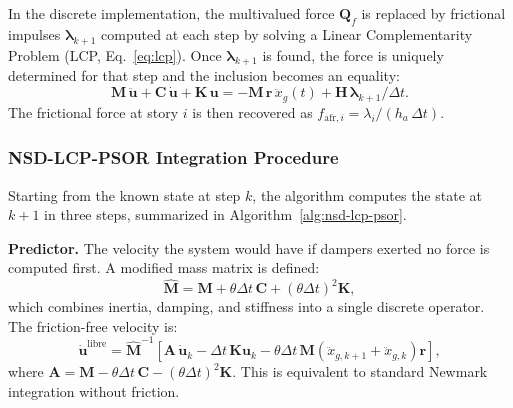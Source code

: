 \documentclass[preprint,12pt,authoryear]{elsarticle}
\newcommand{\ha}{h_a}
\begin{document}
In the discrete implementation, the multivalued force $\bm{Q}_f$ is replaced by
frictional impulses $\bm{\lambda}_{k+1}$ computed at each step by solving a Linear
Complementarity Problem (LCP, Eq.~\ref{eq:lcp}). Once $\bm{\lambda}_{k+1}$ is found,
the force is uniquely determined for that step and the inclusion becomes an equality:
\begin{equation}
    \bm{M}\,\ddot{\bm{u}} + \bm{C}\,\dot{\bm{u}} + \bm{K}\,\bm{u}
    = -\bm{M}\,\bm{r}\,\ddot{x}_g(t) + \bm{H}\,\bm{\lambda}_{k+1}/\Delta t.
    \label{eq:eom_disc}
\end{equation}
The frictional force at story $i$ is then recovered as
$f_{\mathrm{afr},i} = \lambda_i / (\ha\,\Delta t)$.

\subsubsection*{NSD-LCP-PSOR Integration Procedure}

Starting from the known state at step $k$, the algorithm computes the state at $k+1$
in three steps, summarized in Algorithm~\ref{alg:nsd-lcp-psor}.

\textbf{Predictor.}
The velocity the system would have if dampers exerted no force is computed first.
A modified mass matrix is defined:
\begin{equation}
    \hat{\bm{M}} = \bm{M}
                  + \theta\Delta t\,\bm{C}
                  + (\theta\Delta t)^{2}\bm{K},
    \label{eq:Mhat}
\end{equation}
which combines inertia, damping, and stiffness into a single discrete operator.
The friction-free velocity is:
\begin{equation}
    \dot{\bm{u}}^{\mathrm{libre}} = \hat{\bm{M}}^{-1}
    \!\left[
        \bm{A}\,\dot{\bm{u}}_k
        - \Delta t\,\bm{K}\bm{u}_k
        - \theta\Delta t\,\bm{M}\!\left(\ddot{x}_{g,k+1}+\ddot{x}_{g,k}\right)\bm{r}
    \right],
    \label{eq:vfree}
\end{equation}
where $\bm{A} = \bm{M} - \theta\Delta t\,\bm{C} - (\theta\Delta t)^{2}\bm{K}$.
This is equivalent to standard Newmark integration without friction.
\end{document}
